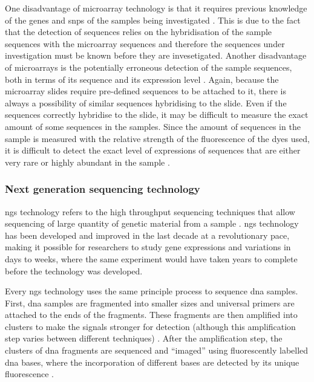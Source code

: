 One disadvantage of microarray technology is that it requires previous knowledge of the genes and \glspl{snp} of the samples being investigated \citep{Hurd2009}.
This is due to the fact that the detection of sequences relies on the hybridisation of the sample sequences with the microarray sequences and therefore the sequences under investigation must be known before they are invesetigated.
Another disadvantage of microarrays is the potentially erroneous detection of the sample sequences, both in terms of its sequence and its expression level \citep{Hurd2009}.
Again, because the microarray slides require pre-defined sequences to be attached to it, there is always a possibility of similar sequences hybridising to the slide.
Even if the sequences correctly hybridise to the slide, it may be difficult to measure the exact amount of some sequences in the samples.
Since the amount of sequences in the sample is measured with the relative strength of the fluorescence of the dyes used, it is difficult to detect the exact level of expressions of sequences that are either very rare or highly abundant in the sample \citep{Hurd2009}.

\subsubsection{Next generation sequencing technology}
\label{ssub:next_generation_sequencing_technology}

\Gls{ngs} technology refers to the high throughput sequencing techniques that allow sequencing of large quantity of genetic material from a sample \citep{Metzker2010}.
\gls{ngs} technology has been developed and improved in the last decade at a revolutionary pace, making it possible for researchers to study gene expressions and variations in days to weeks, where the same experiment would have taken years to complete before the technology was developed.

Every \gls{ngs} technology uses the same principle process to sequence \acrshort{dna} samples.
First, \acrshort{dna} samples are fragmented into smaller sizes and universal primers are attached to the ends of the fragments.
These fragments are then amplified into clusters to make the signals stronger for detection (although this amplification step varies between different techniques) \citep{Metzker2010}.
After the amplification step, the clusters of \acrshort{dna} fragments are sequenced and ``imaged'' using fluorescently labelled \acrshort{dna} bases, where the incorporation of different bases are detected by its unique fluorescence \citep{Metzker2010}.

